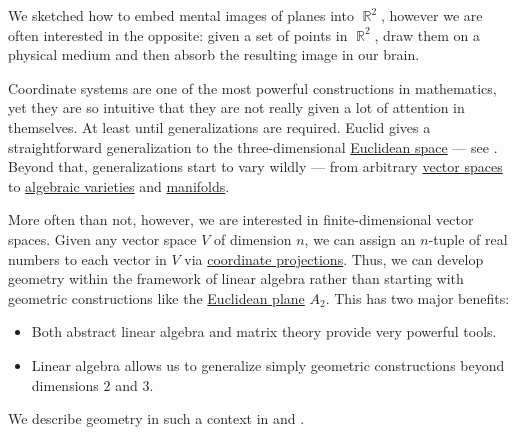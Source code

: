 \begin{remark}\label{rem:coordinate_systems}
  We sketched how to embed mental images of planes into \( \BbbR^2 \), however we are often interested in the opposite: given a set of points in \( \BbbR^2 \), draw them on a physical medium and then absorb the resulting image in our brain.

  Coordinate systems are one of the most powerful constructions in mathematics, yet they are so intuitive that they are not really given a lot of attention in themselves. At least until generalizations are required. Euclid gives a straightforward generalization to the three-dimensional \hyperref[def:euclidean_space]{Euclidean space} --- see \cite{Fitzpatrick2008}. Beyond that, generalizations start to vary wildly --- from arbitrary \hyperref[def:vector_space]{vector spaces} to \hyperref[def:affine_algebraic_set]{algebraic varieties} and \hyperref[def:topological_manifold]{manifolds}.

  More often than not, however, we are interested in finite-dimensional vector spaces. Given any vector space \( V \) of dimension \( n \), we can assign an \( n \)-tuple of real numbers to each vector in \( V \) via \hyperref[def:basis_decomposition]{coordinate projections}. Thus, we can develop geometry within the framework of linear algebra rather than starting with geometric constructions like the \hyperref[def:euclidean_plane]{Euclidean plane} \( A_2 \). This has two major benefits:
  \begin{itemize}
    \item Both abstract linear algebra and matrix theory provide very powerful tools.
    \item Linear algebra allows us to generalize simply geometric constructions beyond dimensions \( 2 \) and \( 3 \).
  \end{itemize}

  We describe geometry in such a context in  and .
\end{remark}
